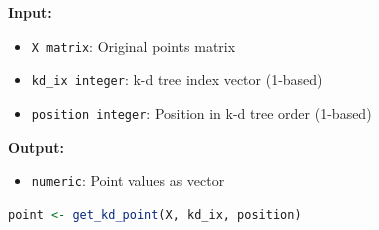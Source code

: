 \documentclass[11pt]{article}
\begin{document}
\begin{enumerate}
\begin{enumerate}
	      	      \textbf{Input:}
	      	      \begin{itemize}
	      	      	\item \texttt{X matrix}: Original points matrix
	      	      	      
	      	      	\item \texttt{kd\_ix integer}: k-d tree index vector (1-based)
	      	      	      
	      	      	\item \texttt{position integer}: Position in k-d tree order (1-based)
	      	      \end{itemize}
	      	      \textbf{Output:}
	      	      \begin{itemize}
	      	      	\item \texttt{numeric}: Point values as vector
	      	      \end{itemize}
	      	      \begin{lstlisting}[language=R]
point <- get_kd_point(X, kd_ix, position)
	      	      \end{lstlisting}
	      \end{enumerate}
\end{enumerate}
\end{document}
